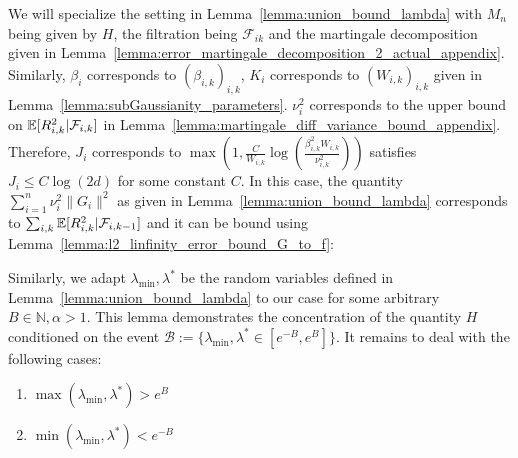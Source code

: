 
 We will specialize the setting in Lemma~\ref{lemma:union_bound_lambda} with $M_n$ being given by $H$, the filtration being $\mathcal{F}_{ik}$ and the martingale decomposition given in Lemma~\ref{lemma:error_martingale_decomposition_2_actual_appendix}. Similarly, $\beta_{i}$ corresponds to $(\beta_{i,k})_{i,k}$, $K_i$ corresponds to  $(W_{i,k})_{i,k}$ given in Lemma~\ref{lemma:subGaussianity_parameters}. $\nu_{i}^2$ corresponds to the upper bound on $\mathbb{E}[R_{i,k}^2|\mathcal{F}_{i,k}]$ in Lemma~\ref{lemma:martingale_diff_variance_bound_appendix}. Therefore, $J_i$ corresponds to $\max(1,\frac{C}{W_{i,k}}\log(\frac{\beta_{i,k}^2W_{i,k}}{\nu_{i,k}^2}))$ satisfies $J_i \leq C\log(2d)$ for some constant $C$. In this case, the quantity $\sum_{i=1}^{n}\nu_i^2\|G_i\|^2 $ as given in Lemma~\ref{lemma:union_bound_lambda} corresponds to $\sum_{i,k}\mathbb{E}[R_{i,k}^2|\mathcal{F}_{i,k-1}]$ and it can be bound using Lemma~\ref{lemma:l2_linfinity_error_bound_G_to_f}:

Similarly, we adapt $\lambda_{\min},\lambda^{*}$ be the random variables defined in Lemma~\ref{lemma:union_bound_lambda} to our case for some arbitrary $B\in \mathbb{N},\alpha > 1$. This lemma demonstrates the concentration of the quantity $H$ conditioned on the event $\mathcal{B}:= \{\lambda_{\min} ,\lambda^{*} \in [e^{-B},e^{B}]\}$. It remains to deal with the following cases:
\begin{enumerate}
    \item $\max(\lambda_{\min},\lambda^{*}) > e^{B}$
    \item $\min(\lambda_{\min},\lambda^{*}) < e^{-B}$
\end{enumerate}


